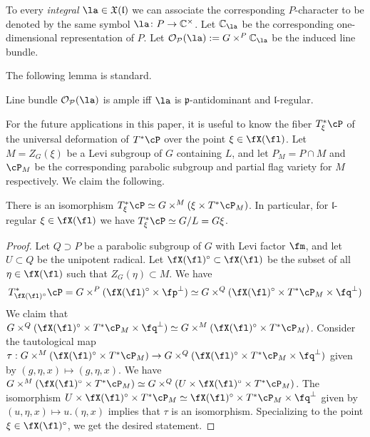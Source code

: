 \documentclass[12pt]{amsart}
\begin{document}
    To every {\emph{integral}} $\la \in \mathfrak{X}(\mathfrak{l})$ we can associate the corresponding $P$-character to be denoted by the same symbol $\la\colon P \rightarrow \mathbb{C}^\times$. Let $\mathbb{C}_\la$ be the corresponding one-dimensional representation of $P$. Let $\mathcal{O}_{\mathcal{P}}(\la):= G \times^P \mathbb{C}_\la$ be the induced line bundle. 


    The following lemma is standard. %
    \begin{lemma}
    Line bundle $\mathcal{O}_{\mathcal{P}}(\la)$ is ample iff $\la$ is $\mathfrak{p}$-antidominant and $\mathfrak{l}$-regular.
    \end{lemma}
      




    For the future applications in this paper, it is useful to know the fiber $T^*_{\xi}\cP$ of the universal deformation of $T^*\cP$ over the point $\xi\in \fX(\fl)$. Let $M=Z_G(\xi)$ be a Levi subgroup of $G$ containing $L$, and let $P_M=P\cap M$ and $\cP_M$ be the corresponding parabolic subgroup and partial flag variety for $M$ respectively. We claim the following.
    \begin{lemma}\label{fiber of deformation of parabolic}
        There is an isomorphism $T^*_{\xi}\cP\simeq G\times^M (\xi\times T^*\cP_M)$. In particular, for $\mathfrak{l}$-regular $\xi\in \fX(\fl)$ we have $T^*_{\xi}\cP\simeq G/L=G\xi$.
    \end{lemma}
    \begin{proof}
        Let $Q\supset P$ be a parabolic subgroup of $G$ with Levi factor $\fm$, and let $U\subset Q$ be the unipotent radical. Let $\fX(\fl)^\circ\subset \fX(\fl)$ be the subset of all $\eta\in \fX(\fl)$ such that $Z_G(\eta)\subset M$. We have 
        $$T^*_{\fX(\fl)^\circ}\cP=G\times^P(\fX(\fl)^\circ\times \fp^\perp)\simeq G\times^Q(\fX(\fl)^\circ\times T^*\cP_M\times \fq^\perp)$$
        We claim that $G\times^Q(\fX(\fl)^\circ\times T^*\cP_M\times \fq^\perp)\simeq G\times^M(\fX(\fl)^\circ\times T^*\cP_M)$. Consider the tautological map $\tau: G\times^M(\fX(\fl)^\circ\times T^*\cP_M)\to G\times^Q(\fX(\fl)^\circ\times T^*\cP_M\times \fq^\perp)$ given by $(g, \eta, x)\mapsto (g, \eta, x)$. We have $G\times^M(\fX(\fl)^\circ\times T^*\cP_M)\simeq G\times^Q(U\times \fX(\fl)^\circ\times T^*\cP_M)$. The isomorphism $U\times \fX(\fl)^\circ\times T^*\cP_M\simeq \fX(\fl)^\circ\times T^*\cP_M\times \fq^\perp$ given by $(u,\eta,x)\mapsto u.(\eta, x)$ implies that $\tau$ is an isomorphism. Specializing to the point $\xi\in \fX(\fl)^\circ$, we get the desired statement.
    \end{proof}
    
\end{document}
